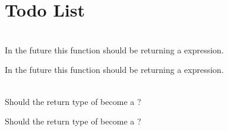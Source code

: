 \chapter{Todo List}
\hypertarget{todo}{}\label{todo}

\begin{DoxyRefList}
\item[Member \doxylink{classEigen_1_1Transform_a41e2e58b09790eb8e3e220acceb7de1f}{Eigen\+::Transform\texorpdfstring{$<$}{<} \+\_\+\+Scalar, \+\_\+\+Dim, \+\_\+\+Mode, \+\_\+\+Options \texorpdfstring{$>$}{>}\+::Identity} ()]\hfill \\
\label{todo__todo000001}%
%
In the future this function should be returning a  expression. 

\label{todo__todo000003}%
%
In the future this function should be returning a  expression.  
\item[Member \doxylink{group__Geometry__Module_ga033d6550c1fc82e232f2b4c380c19a54}{Eigen\+::umeyama} (const Matrix\+Base$<$ Derived $>$ \&src, const Matrix\+Base$<$ Other\+Derived $>$ \&dst, bool with\+\_\+scaling=true)]\hfill \\
\label{todo__todo000002}%
%
Should the return type of  become a ?

\label{todo__todo000004}%
%
Should the return type of  become a ?
\end{DoxyRefList}